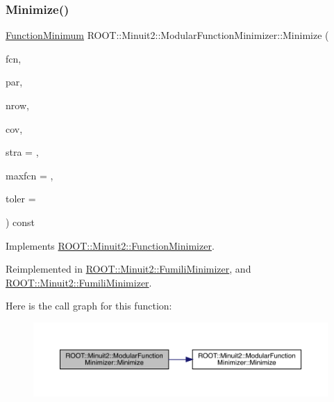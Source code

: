 \subsubsection{\texorpdfstring{Minimize()}{Minimize()}\hspace{0.1cm}{\footnotesize\ttfamily [7/22]}}
{\footnotesize\ttfamily \mbox{\hyperlink{classROOT_1_1Minuit2_1_1FunctionMinimum}{Function\+Minimum}} R\+O\+O\+T\+::\+Minuit2\+::\+Modular\+Function\+Minimizer\+::\+Minimize (\begin{DoxyParamCaption}\item[{const \mbox{\hyperlink{classROOT_1_1Minuit2_1_1FCNGradientBase}{F\+C\+N\+Gradient\+Base}} \&}]{fcn,  }\item[{const std\+::vector$<$ double $>$ \&}]{par,  }\item[{unsigned int}]{nrow,  }\item[{const std\+::vector$<$ double $>$ \&}]{cov,  }\item[{unsigned int}]{stra = {},  }\item[{unsigned int}]{maxfcn = {},  }\item[{double}]{toler = {} }\end{DoxyParamCaption}) const\hspace{0.3cm}{\ttfamily [virtual]}}



Implements \mbox{\hyperlink{classROOT_1_1Minuit2_1_1FunctionMinimizer_a467a9dd60665c9b31969fe55d73b6401}{R\+O\+O\+T\+::\+Minuit2\+::\+Function\+Minimizer}}.



Reimplemented in \mbox{\hyperlink{classROOT_1_1Minuit2_1_1FumiliMinimizer_aa17be65e26311aa25f6fd3680f747958}{R\+O\+O\+T\+::\+Minuit2\+::\+Fumili\+Minimizer}}, and \mbox{\hyperlink{classROOT_1_1Minuit2_1_1FumiliMinimizer_aa17be65e26311aa25f6fd3680f747958}{R\+O\+O\+T\+::\+Minuit2\+::\+Fumili\+Minimizer}}.

Here is the call graph for this function\+:\nopagebreak
\begin{figure}[H]
\begin{center}
\leavevmode
\includegraphics[width=350pt]{d3/dc8/classROOT_1_1Minuit2_1_1ModularFunctionMinimizer_a1cab3c0cc40932cb9287232fe9cf7437_cgraph}
\end{center}
\end{figure}
\mbox{\label{classROOT_1_1Minuit2_1_1ModularFunctionMinimizer_a97334cf66537c195aa8d6df14e745bef}} 
